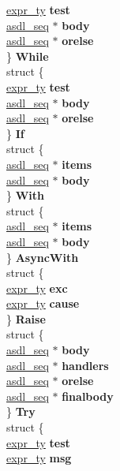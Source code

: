 \begin{DoxyCompactItemize}
\begin{tabbing}
\>\>\hyperlink{struct__expr}{expr\_ty} {\bfseries test}\\
\>\>\hyperlink{structasdl__seq}{asdl\_seq} $\ast$ {\bfseries body}\\
\>\>\hyperlink{structasdl__seq}{asdl\_seq} $\ast$ {\bfseries orelse}\\
\>\} {\bfseries While}\\
\>struct \{\\
\>\>\hyperlink{struct__expr}{expr\_ty} {\bfseries test}\\
\>\>\hyperlink{structasdl__seq}{asdl\_seq} $\ast$ {\bfseries body}\\
\>\>\hyperlink{structasdl__seq}{asdl\_seq} $\ast$ {\bfseries orelse}\\
\>\} {\bfseries If}\\
\>struct \{\\
\>\>\hyperlink{structasdl__seq}{asdl\_seq} $\ast$ {\bfseries items}\\
\>\>\hyperlink{structasdl__seq}{asdl\_seq} $\ast$ {\bfseries body}\\
\>\} {\bfseries With}\\
\>struct \{\\
\>\>\hyperlink{structasdl__seq}{asdl\_seq} $\ast$ {\bfseries items}\\
\>\>\hyperlink{structasdl__seq}{asdl\_seq} $\ast$ {\bfseries body}\\
\>\} {\bfseries AsyncWith}\\
\>struct \{\\
\>\>\hyperlink{struct__expr}{expr\_ty} {\bfseries exc}\\
\>\>\hyperlink{struct__expr}{expr\_ty} {\bfseries cause}\\
\>\} {\bfseries Raise}\\
\>struct \{\\
\>\>\hyperlink{structasdl__seq}{asdl\_seq} $\ast$ {\bfseries body}\\
\>\>\hyperlink{structasdl__seq}{asdl\_seq} $\ast$ {\bfseries handlers}\\
\>\>\hyperlink{structasdl__seq}{asdl\_seq} $\ast$ {\bfseries orelse}\\
\>\>\hyperlink{structasdl__seq}{asdl\_seq} $\ast$ {\bfseries finalbody}\\
\>\} {\bfseries Try}\\
\>struct \{\\
\>\>\hyperlink{struct__expr}{expr\_ty} {\bfseries test}\\
\>\>\hyperlink{struct__expr}{expr\_ty} {\bfseries msg}\\

\end{tabbing}
\end{DoxyCompactItemize}
